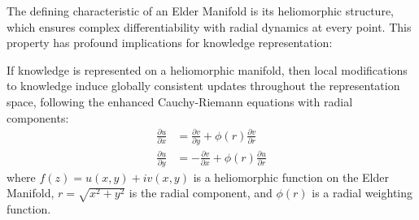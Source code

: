 The defining characteristic of an Elder Manifold is its heliomorphic structure, which ensures complex differentiability with radial dynamics at every point. This property has profound implications for knowledge representation:

\begin{theorem}
If knowledge is represented on a heliomorphic manifold, then local modifications to knowledge induce globally consistent updates throughout the representation space, following the enhanced Cauchy-Riemann equations with radial components:
\begin{align}
\frac{\partial u}{\partial x} &= \frac{\partial v}{\partial y} + \phi(r)\frac{\partial v}{\partial r} \\
\frac{\partial u}{\partial y} &= -\frac{\partial v}{\partial x} + \phi(r)\frac{\partial u}{\partial r}
\end{align}
where $f(z) = u(x,y) + iv(x,y)$ is a heliomorphic function on the Elder Manifold, $r = \sqrt{x^2 + y^2}$ is the radial component, and $\phi(r)$ is a radial weighting function.
\end{theorem}

